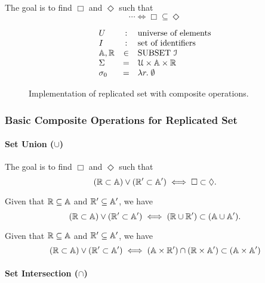 The goal is to find $\Box$ and $\Diamond$ such that 	
\[
   \cdots \iff \Box \subseteq \Diamond
\]

\begin{figure}[t]
  \[
    \begin{array}{lcl}
      U &:& \text{universe of elements}	\\
      I &:& \text{set of identifiers}	\\
      \mathbb{A}, \mathbb{R}  &\in& \text{SUBSET } \mathcal{I}	\\
      \Sigma &=& \mathcal{U} \times \mathbb{A} \times \mathbb{R} \\
      \sigma_{0} &=& \lambda r.\; \emptyset
    \end{array}
  \]
  \caption{Implementation of replicated set with composite operations.}
  \label{fig:rset-protocol}
\end{figure}

\subsubsection{Basic Composite Operations for Replicated Set}	\label{sss:rset-basic}

\paragraph{Set Union ($\cup$)}

The goal is to find $\Box$ and $\Diamond$ such that
\[
  (\mathbb{R} \subset \mathbb{A}) \lor (\mathbb{R}' \subset \mathbb{A}') \iff \Box \subset \Diamond.
\]

\begin{theorem}  \label{thm:union}
  Given that $\mathbb{R} \subseteq \mathbb{A}$ and $\mathbb{R}' \subseteq \mathbb{A}'$, we have
  \[
    (\mathbb{R} \subset \mathbb{A}) \lor (\mathbb{R}' \subset \mathbb{A}') \iff (\mathbb{R} \cup \mathbb{R}') \subset (\mathbb{A} \cup \mathbb{A}').
  \]
\end{theorem}

\begin{theorem}  \label{thm:union-alt}	
  Given that $\mathbb{R} \subseteq \mathbb{A}$ and $\mathbb{R}' \subseteq \mathbb{A}'$, we have
  \[
    (\mathbb{R} \subset \mathbb{A}) \lor (\mathbb{R}' \subset \mathbb{A}') \iff 
    (\mathbb{A} \times \mathbb{R}') \cap (\mathbb{R} \times \mathbb{A}') \subset (\mathbb{A} \times \mathbb{A}')
  \]
\end{theorem}
\paragraph{Set Intersection ($\cap$)}

